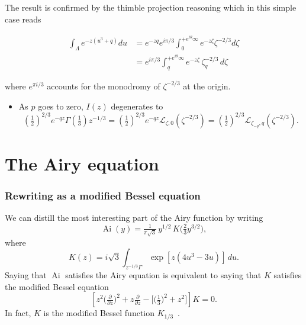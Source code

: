 \documentclass{article}
\theoremstyle{definition}
\DeclareMathOperator{\Ai}{Ai}
\newcommand{\laplace}{\mathcal{L}}
\begin{document}
The result is confirmed by the thimble projection reasoning which in this simple case reads

\begin{align*}
    \int_{\Lambda} e^{-z (u^3+q)} du &= e^{-zq} e^{i\pi/3} \int_0^{+e^{i\theta}\infty} e^{-z\zeta} \zeta^{-2/3} d\zeta\\
    &= e^{i\pi/3} \int_q^{+e^{i\theta}\infty} e^{-z\zeta} \, \zeta_q^{-2/3}\,  d\zeta
\end{align*}

where $e^{\pi i/3}$ accounts for the monodromy of $\zeta^{-2/3}$ at the origin. 


\color{DarkTurquoise}
\begin{itemize}
\item As $p$ goes to zero, $I(z)$ degenerates to
\[ \left(\tfrac{1}{2}\right)^{2/3} e^{-qz} \Gamma(\tfrac{1}{3}) z^{-1/3} = \left(\tfrac{1}{2}\right)^{2/3} e^{-qz} \laplace_{\zeta,0}(\zeta^{-2/3}) = \left(\tfrac{1}{2}\right)^{2/3} \laplace_{\zeta_{-q},q}(\zeta^{-2/3}). \]
\end{itemize}

\color{black}

\appendix

\section{The Airy equation}\label{airy-appendix}

\subsubsection{Rewriting as a modified Bessel equation}
We can distill the most interesting part of the Airy function by writing
\[ \Ai(y) = \tfrac{1}{\pi\sqrt{3}}\,y^{1/2}\,K\big(\tfrac{2}{3} y^{3/2}\big), \]
where
\begin{equation}\label{integral:mod-bessel}
K(z) = i\sqrt{3} \int_{z^{-1/3}\Gamma} \exp\left[z \left(4u^3 - 3u\right)\right]\,du.
\end{equation}
Saying that $\Ai$ satisfies the Airy equation is equivalent to saying that $K$ satisfies the modified Bessel equation
\begin{equation}\label{eqn:mod-bessel-1/3}
\left[z^2 \big(\tfrac{\partial}{\partial z}\big)^2 + z \tfrac{\partial}{\partial z} - \big[\big(\tfrac{1}{3}\big)^2 + z^2\big]\right] K = 0.
\end{equation}
In fact, $K$ is the modified Bessel function $K_{1/3}$~\cite[equation~9.6.1]{dlmf}.
\end{document}
